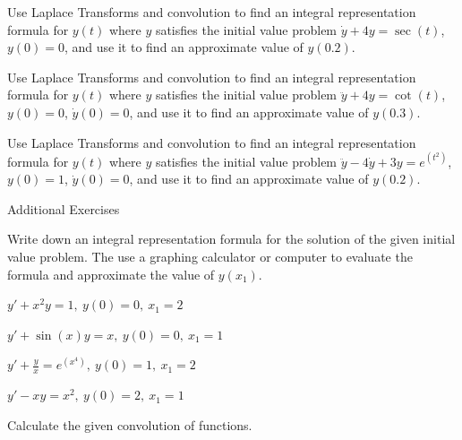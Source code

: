 {{{\begin{exe}
Use Laplace Transforms and convolution to find an integral representation formula for $y(t)$ where $y$ satisfies the initial value problem $\dot{y} + 4y = \sec(t)$, $y(0)=0$, and use it to find an approximate value of $y(0.2)$.
\end{exe}

\begin{exe}
Use Laplace Transforms and convolution to find an integral representation formula for $y(t)$ where $y$  satisfies the initial value problem $\ddot{y}+4y = \cot(t)$, $y(0)=0$, $\dot{y}(0)=0$, and use it to find an approximate value of $y(0.3)$.
\end{exe}


\begin{exe}
Use Laplace Transforms and convolution to find an integral representation formula for $y(t)$ where $y$  satisfies the initial value problem $\ddot{y}-4\dot{y}+3y = e^{(t^2)}$, $y(0)=1$, $\dot{y}(0)=0$, and use it to find an approximate value of $y(0.2)$.
\end{exe}



%
%




\newpage
\begin{center} {\LARGE Additional Exercises} \end{center}

\bigskip
\begin{multicols}{2}
\begin{instructions}
Write down an integral representation formula for the solution of the given initial value problem.  The use a graphing calculator or computer to evaluate the formula and approximate the value of $y(x_1)$.
\end{instructions}

\smallskip
\ap $y'+x^2y=1, \ y(0)=0, \ x_1 = 2$

\ap $y' + \sin(x) y = x, \ y(0)=0, \ x_1 = 1$

\ap $y' + \frac{y}{x} = e^{(x^4)}, \ y(0)=1, \ x_1 = 2$

\ap $y' - xy = x^2, \ y(0)=2, \ x_1 = 1$


\begin{instructions}
Calculate the given convolution of functions.
\end{instructions}


\end{multicols}}}}
